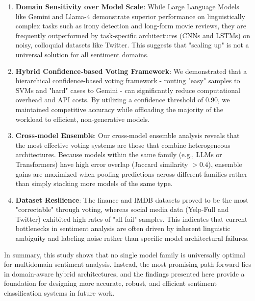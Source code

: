 \documentclass[conference]{IEEEtran}
\begin{document}
\begin{enumerate}
    \item \textbf{Domain Sensitivity over Model Scale}: While Large Language Models like Gemini and Llama-4 demonstrate superior performance on linguistically complex tasks such as irony detection and long-form movie reviews, they are frequently outperformed by task-specific architectures (CNNs and LSTMs) on noisy, colloquial datasets like Twitter. This suggests that "scaling up" is not a universal solution for all sentiment domains.

    \item \textbf{Hybrid Confidence-based Voting Framework}: We demonstrated that a hierarchical confidence-based voting framework - routing "easy" samples to SVMs and "hard" cases to Gemini - can significantly reduce computational overhead and API costs. By utilizing a confidence threshold of 0.90, we maintained competitive accuracy while offloading the majority of the workload to efficient, non-generative models.

    \item \textbf{Cross-model Ensemble}: Our cross-model ensemble analysis reveals that the most effective voting systems are those that combine heterogeneous architectures. Because models within the same family (e.g., LLMs or Transformers) have high error overlap (Jaccard similarity $> 0.4$), ensemble gains are maximized when pooling predictions across different families rather than simply stacking more models of the same type.

    \item \textbf{Dataset Resilience}: The finance and IMDB datasets proved to be the most "correctable" through voting, whereas social media data (Yelp-Full and Twitter) exhibited high rates of "all-fail" samples. This indicates that current bottlenecks in sentiment analysis are often driven by inherent linguistic ambiguity and labeling noise rather than specific model architectural failures.
\end{enumerate}

In summary, this study shows that no single model family is universally optimal for multidomain sentiment analysis. Instead, the most promising path forward lies in domain-aware hybrid architectures, and the findings presented here provide a foundation for designing more accurate, robust, and efficient sentiment classification systems in future work.
\newpage


\end{document}
